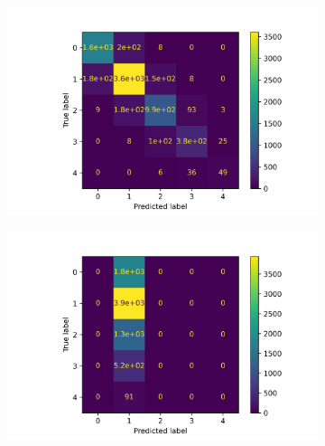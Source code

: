 \begin{figure}[H]
\begin{subfigure}{.49\textwidth}
  \centering
  \includegraphics[width=\linewidth]{randomForestConfusionMatrix.png}  
  \caption{}
  \label{subfig:randomForest}
\end{subfigure}
\begin{subfigure}{.49\textwidth}
  \centering
  \includegraphics[width=\linewidth]{multinomialNaiveBayesConfusionMatrix.png} 
  \caption{}
  \label{subfig:naiveBayes}
\end{subfigure}


\end{figure}

